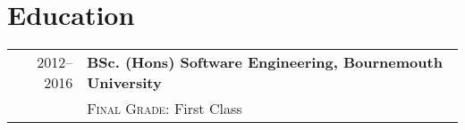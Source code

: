 \section{Education}\label{sec:education}
\begin{tabular}{r|p{11cm}}
    2012--2016 & \textbf{BSc. (Hons) Software Engineering, Bournemouth University}\\
    & \textsc{Final Grade}: First Class
\end{tabular}
